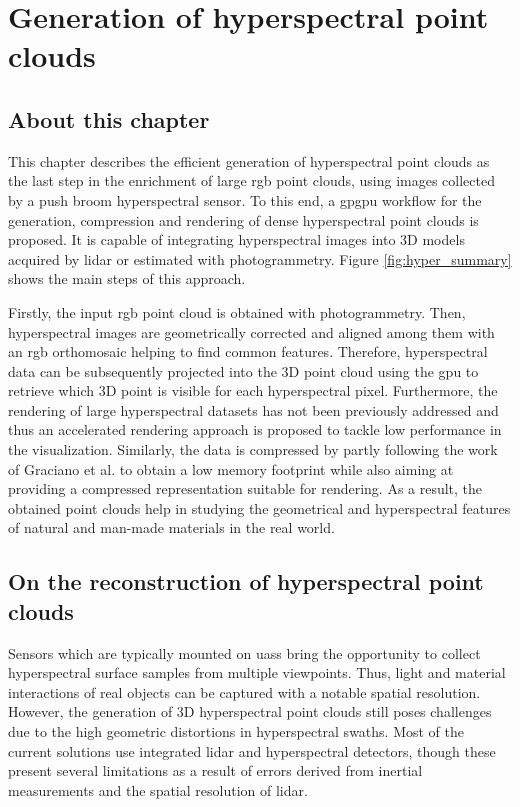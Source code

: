\setchapterpreamble[u]{\margintoc}
\chapter{Generation of hyperspectral point clouds}
\label{sec:hyperspectral_point_clouds}

\section*{About this chapter}

This chapter describes the efficient generation of hyperspectral point clouds as the last step in the enrichment of large \acrshort{rgb} point clouds, using images collected by a push broom hyperspectral sensor. To this end, a \acrshort{gpgpu} workflow for the generation, compression and rendering of dense hyperspectral point clouds is proposed. It is capable of integrating hyperspectral images into 3D models acquired by \acrshort{lidar} or estimated with photogrammetry. Figure \ref{fig:hyper_summary} shows the main steps of this approach.

Firstly, the input \acrshort{rgb} point cloud is obtained with photogrammetry. Then, hyperspectral images are geometrically corrected and aligned among them with an \acrshort{rgb} orthomosaic helping to find common features. Therefore, hyperspectral data can be subsequently projected into the 3D point cloud using the \acrshort{gpu} to retrieve which 3D point is visible for each hyperspectral pixel. Furthermore, the rendering of large hyperspectral datasets has not been previously addressed and thus an accelerated rendering approach is proposed to tackle low performance in the visualization. Similarly, the data is compressed by partly following the work of Graciano et al. \cite{graciano_quadstack_2021} to obtain a low memory footprint while also aiming at providing a compressed representation suitable for rendering. As a result, the obtained point clouds help in studying the geometrical and hyperspectral features of natural and man-made materials in the real world.

\section{On the reconstruction of hyperspectral point clouds}

Sensors which are typically mounted on \acrshort{uas}s bring the opportunity to collect hyperspectral surface samples from multiple viewpoints. Thus, light and material interactions of real objects can be captured with a notable spatial resolution. However, the generation of 3D hyperspectral point clouds still poses challenges due to the high geometric distortions in hyperspectral swaths. Most of the current solutions use integrated \acrshort{lidar} and hyperspectral detectors, though these present several limitations as a result of errors derived from inertial measurements and the spatial resolution of \acrshort{lidar}. 

